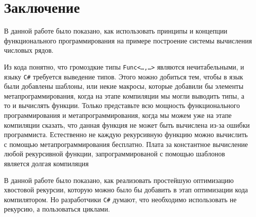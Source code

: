 \newpage
\section*{Заключение}
В данной работе было показано, как использовать принципы и концепции функционального программирования на примере построение системы вычисления числовых рядов.

Из кода понятно, что громоздкие типы \texttt{Func<\dots,\dots>} являются нечитабельными, и языку \texttt{C\#} требуется выведение типов.
Этого можно добиться тем, чтобы в язык были добавлены шаблоны, или некие макросы, которые добавили бы элементы метапрограммирования, когда на этапе компиляции мы могли выводить типы, а то и вычислять функции.
Только представьте всю мощность функционального программирования и метапрограммирования, когда мы можем уже на этапе компиляции сказать, что данная функция не может быть вычислена из-за ошибки программиста.
Естественно не каждую рекурсивную функцию можно вычислить с помощью метапрограммирования бесплатно.
Плата за константное вычисление любой рекурсивной функции, запрограммированой с помощью шаблонов является долгая компиляция

В данной работе было показано, как реализовать простейшую оптимизацию хвостовой рекурсии, которую можно было бы добавить в этап оптимизации кода компилятором.
Но разработчики \texttt{C\#} думают, что необходимо использовать не рекурсию, а пользоваться циклами.
